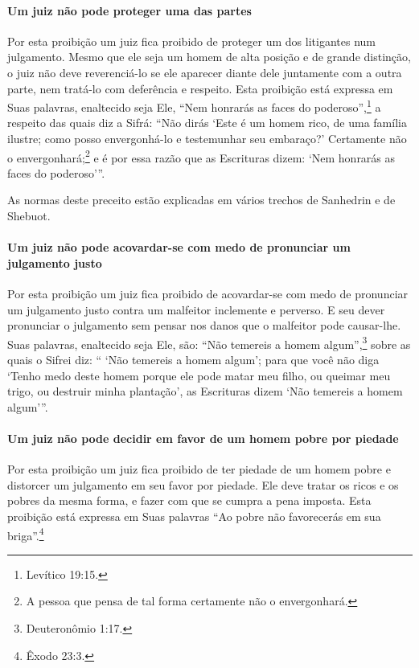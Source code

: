 \paragraph{Um juiz não pode proteger uma das partes}

Por esta proibição um juiz fica proibido de proteger um dos litigantes
num julgamento. Mesmo que ele seja um homem de alta posição e de grande
distinção, o juiz não deve reverenciá-lo se ele aparecer diante dele
juntamente com a outra parte, nem tratá-lo com deferência e respeito.
Esta proibição está expressa em Suas palavras, enaltecido seja Ele,
``Nem honrarás as faces do poderoso'',\footnote{Levítico 19:15.} a respeito das
quais diz a Sifrá: ``Não dirás `Este é um homem rico, de uma família
ilustre; como posso envergonhá-lo e testemunhar seu embaraço?'
Certamente não o envergonhará;\footnote{A pessoa que pensa de tal forma certamente não o envergonhará.} e é por essa razão
que as Escrituras dizem: `Nem honrarás as faces do poderoso'''.

As normas deste preceito estão explicadas em vários trechos de Sanhedrin e de Shebuot.

\paragraph{Um juiz não pode acovardar-se com medo de pronunciar um julgamento justo}

Por esta proibição um juiz fica proibido de acovardar-se com medo de
pronunciar um julgamento justo contra um malfeitor inclemente e
perverso. E seu dever pronunciar o julgamento sem pensar nos danos que
o malfeitor pode causar-lhe. Suas palavras, enaltecido seja Ele, são:
``Não temereis a homem algum'',\footnote{Deuteronômio 1:17.} sobre as quais o
Sifrei diz: `` `Não temereis a homem algum'; para que você não diga
`Tenho medo deste homem porque ele pode matar meu filho, ou queimar meu
trigo, ou destruir minha plantação', as Escrituras dizem `Não temereis a
homem algum'''.

\paragraph{Um juiz não pode decidir em favor de um homem pobre por piedade}

Por esta proibição um juiz fica proibido de ter piedade de um homem
pobre e distorcer um julgamento em seu favor por piedade. Ele deve
tratar os ricos e os pobres da mesma forma, e fazer com que se cumpra a
pena imposta. Esta proibição está expressa em Suas palavras ``Ao pobre
não favorecerás em sua briga''.\footnote{Êxodo 23:3.}

